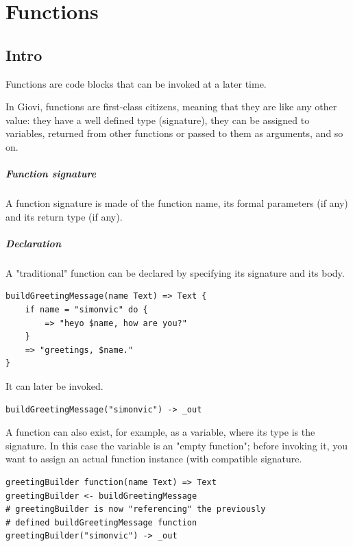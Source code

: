\chapter{Functions}
\label{ch:functions}

\section{Intro}

Functions are code blocks that can be invoked at a later time.

In Giovi, functions are first-class citizens, meaning that they are like any
other value: they have a well defined type (signature), they can be assigned to
variables, returned from other functions or passed to them as arguments, and so
on.

\paragraph{Function signature} A function signature is made of the function
name, its formal parameters (if any) and its return type (if any).

\paragraph{Declaration} A "traditional" function can be declared
by specifying its signature and its body.

\begin{verbatim}
buildGreetingMessage(name Text) => Text {
	if name = "simonvic" do {
		=> "heyo $name, how are you?"
	}
	=> "greetings, $name."
}
\end{verbatim}

It can later be invoked.


\begin{verbatim}
buildGreetingMessage("simonvic") -> _out
\end{verbatim}

A function can also exist, for example, as a variable, where its type is the
signature. In this case the variable is an "empty function"; before invoking
it, you want to assign an actual function instance (with compatible signature.

\begin{verbatim}
greetingBuilder function(name Text) => Text
greetingBuilder <- buildGreetingMessage
# greetingBuilder is now "referencing" the previously
# defined buildGreetingMessage function
greetingBuilder("simonvic") -> _out
\end{verbatim}

